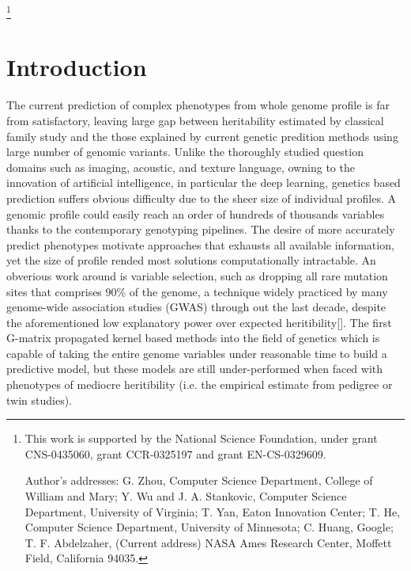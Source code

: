 \documentclass[acmtog, authorversion]{acmart}
\begin{document}
%
%




\thanks{This work is supported by the National Science Foundation,
  under grant CNS-0435060, grant CCR-0325197 and grant EN-CS-0329609.

  Author's addresses: G. Zhou, Computer Science Department, College of
  William and Mary; Y. Wu {and} J. A. Stankovic, Computer Science
  Department, University of Virginia; T. Yan, Eaton Innovation Center;
  T. He, Computer Science Department, University of Minnesota; C.
  Huang, Google; T. F. Abdelzaher, (Current address) NASA Ames
  Research Center, Moffett Field, California 94035.}


\maketitle


\section{Introduction}
The current prediction of complex phenotypes from whole genome profile is far from satisfactory, leaving large gap between heritability estimated by classical family study and the those explained by current genetic predition methods using large number of genomic variants. Unlike the thoroughly studied question domains such as imaging, acoustic, and texture language, owning to the innovation of artificial intelligence, in particular the deep learning, genetics based prediction suffers obvious difficulty due to the sheer size of individual profiles. A genomic profile could easily reach an order of hundreds of thousands variables thanks to the contemporary genotyping pipelines. The desire of more accurately predict phenotypes motivate approaches that exhausts all available information, yet the size of profile rended most solutions computationally intractable. An obverious work around is variable selection, such as dropping all rare mutation sites that comprises 90\% of the genome, a technique widely practiced by many genome-wide association studies (GWAS) through out the last decade, despite the aforementioned low explanatory power over expected heritibility[]. The first G-matrix propagated kernel based methods into the field of genetics which is capable of taking the entire genome variables under reasonable time to build a predictive model, but these models are still under-performed when faced with phenotypes of mediocre heritibility (i.e. the empirical estimate from pedigree or twin studies).
\end{document}
